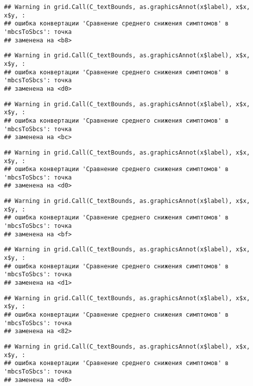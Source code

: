 \documentclass[
]{article}
\begin{document}
\begin{verbatim}
## Warning in grid.Call(C_textBounds, as.graphicsAnnot(x$label), x$x, x$y, :
## ошибка конвертации 'Сравнение среднего снижения симптомов' в 'mbcsToSbcs': точка
## заменена на <b8>
\end{verbatim}

\begin{verbatim}
## Warning in grid.Call(C_textBounds, as.graphicsAnnot(x$label), x$x, x$y, :
## ошибка конвертации 'Сравнение среднего снижения симптомов' в 'mbcsToSbcs': точка
## заменена на <d0>
\end{verbatim}

\begin{verbatim}
## Warning in grid.Call(C_textBounds, as.graphicsAnnot(x$label), x$x, x$y, :
## ошибка конвертации 'Сравнение среднего снижения симптомов' в 'mbcsToSbcs': точка
## заменена на <bc>
\end{verbatim}

\begin{verbatim}
## Warning in grid.Call(C_textBounds, as.graphicsAnnot(x$label), x$x, x$y, :
## ошибка конвертации 'Сравнение среднего снижения симптомов' в 'mbcsToSbcs': точка
## заменена на <d0>
\end{verbatim}

\begin{verbatim}
## Warning in grid.Call(C_textBounds, as.graphicsAnnot(x$label), x$x, x$y, :
## ошибка конвертации 'Сравнение среднего снижения симптомов' в 'mbcsToSbcs': точка
## заменена на <bf>
\end{verbatim}

\begin{verbatim}
## Warning in grid.Call(C_textBounds, as.graphicsAnnot(x$label), x$x, x$y, :
## ошибка конвертации 'Сравнение среднего снижения симптомов' в 'mbcsToSbcs': точка
## заменена на <d1>
\end{verbatim}

\begin{verbatim}
## Warning in grid.Call(C_textBounds, as.graphicsAnnot(x$label), x$x, x$y, :
## ошибка конвертации 'Сравнение среднего снижения симптомов' в 'mbcsToSbcs': точка
## заменена на <82>
\end{verbatim}

\begin{verbatim}
## Warning in grid.Call(C_textBounds, as.graphicsAnnot(x$label), x$x, x$y, :
## ошибка конвертации 'Сравнение среднего снижения симптомов' в 'mbcsToSbcs': точка
## заменена на <d0>
\end{verbatim}
\end{document}
